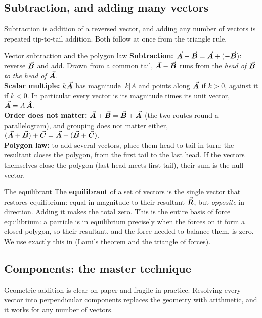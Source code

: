 \subsection{Subtraction, and adding many vectors}

Subtraction is addition of a reversed vector, and adding any number of vectors is repeated tip-to-tail
addition. Both follow at once from the triangle rule.

\begin{keybox}{Vector subtraction and the polygon law}
\textbf{Subtraction:} $\vec{\bm{A}}-\vec{\bm{B}}=\vec{\bm{A}}+(-\vec{\bm{B}})$: reverse $\vec{\bm{B}}$ and add. Drawn from a common tail, $\vec{\bm{A}}-\vec{\bm{B}}$ runs from
the \emph{head of $\vec{\bm{B}}$ to the head of $\vec{\bm{A}}$}. \\[3pt]
\textbf{Scalar multiple:} $k\vec{\bm{A}}$ has magnitude $|k|A$ and points along $\vec{\bm{A}}$ if $k>0$, against it
if $k<0$. In particular every vector is its magnitude times its unit vector, $\vec{\bm{A}}=A\,\hat{\bm{A}}$. \\[3pt]
\textbf{Order does not matter:} $\vec{\bm{A}}+\vec{\bm{B}}=\vec{\bm{B}}+\vec{\bm{A}}$ (the two routes round a parallelogram), and
grouping does not matter either, $(\vec{\bm{A}}+\vec{\bm{B}})+\vec{\bm{C}}=\vec{\bm{A}}+(\vec{\bm{B}}+\vec{\bm{C}})$. \\[3pt]
\textbf{Polygon law:} to add several vectors, place them head-to-tail in turn; the resultant closes the
polygon, from the first tail to the last head. If the vectors themselves close the polygon (last head
meets first tail), their sum is the null vector.
\end{keybox}

\begin{defbox}{The equilibrant}
The \textbf{equilibrant} of a set of vectors is the single vector that restores equilibrium: equal in
magnitude to their resultant $\vec{\bm{R}}$, but \emph{opposite} in direction. Adding it makes the total zero.
This is the entire basis of force equilibrium: a particle is in equilibrium precisely when the forces on
it form a closed polygon, so their resultant, and the force needed to balance them, is zero. We
use exactly this in  (Lami's theorem and the triangle of forces).
\end{defbox}

\subsection{Components: the master technique}

Geometric addition is clear on paper and fragile in practice. Resolving every vector into perpendicular
components replaces the geometry with arithmetic, and it works for any number of vectors.

